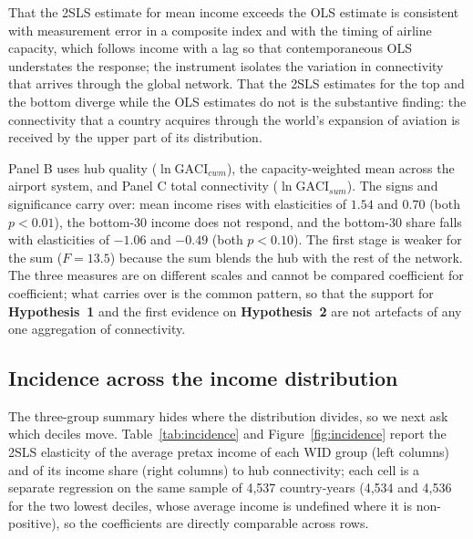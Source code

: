 That the 2SLS estimate for mean income exceeds the OLS estimate is consistent with measurement error in a composite index and with the timing of airline capacity, which follows income with a lag so that contemporaneous OLS understates the response; the instrument isolates the variation in connectivity that arrives through the global network. That the 2SLS estimates for the top and the bottom diverge while the OLS estimates do not is the substantive finding: the connectivity that a country acquires through the world's expansion of aviation is received by the upper part of its distribution.

Panel B uses hub quality ($\ln\mathrm{GACI}_{cwm}$), the capacity-weighted mean across the airport system, and Panel C total connectivity ($\ln\mathrm{GACI}_{sum}$). The signs and significance carry over: mean income rises with elasticities of $1.54$ and $0.70$ (both $p<0.01$), the bottom-30 income does not respond, and the bottom-30 share falls with elasticities of $-1.06$ and $-0.49$ (both $p<0.10$). The first stage is weaker for the sum ($F=13.5$) because the sum blends the hub with the rest of the network. The three measures are on different scales and cannot be compared coefficient for coefficient; what carries over is the common pattern, so that the support for \textbf{Hypothesis~1} and the first evidence on \textbf{Hypothesis~2} are not artefacts of any one aggregation of connectivity.

\subsection{Incidence across the income distribution}
\label{sec:incidence}
The three-group summary hides where the distribution divides, so we next ask which deciles move. Table~\ref{tab:incidence} and Figure~\ref{fig:incidence} report the 2SLS elasticity of the average pretax income of each WID group (left columns) and of its income share (right columns) to hub connectivity; each cell is a separate regression on the same sample of 4{,}537 country-years (4{,}534 and 4{,}536 for the two lowest deciles, whose average income is undefined where it is non-positive), so the coefficients are directly comparable across rows.

